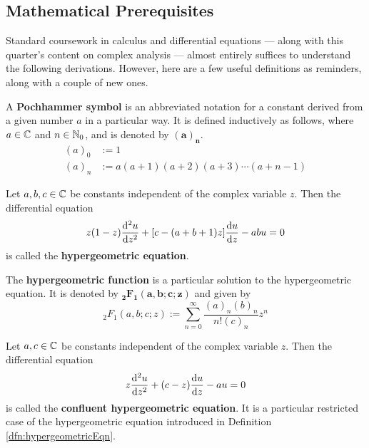 \documentclass[titlepage]{article}
\numberwithin{equation}{section}
\begin{document}
\subsection{Mathematical Prerequisites}\label{sss:prereqs}
Standard coursework in calculus and differential equations --- along with this quarter's content on complex analysis --- almost entirely suffices to understand the following derivations. However, here are a few useful definitions as reminders, along with a couple of new ones.
\begin{definition}
    A \textbf{Pochhammer symbol} is an abbreviated notation for a constant derived from a given number $a$ in a particular way. It is defined inductively as follows, where $a\in\mathbb{C}$ and $n\in\mathbb{N}_0$, and is denoted by $\bm{(a)_n}$.
    \begin{align*}
        (a)_0 &:= 1\\
        (a)_n &:= a(a+1)(a+2)(a+3)\cdots(a+n-1)\tag{$n=1,2,3,\dots$}
    \end{align*}
\end{definition}
\begin{definition}\label{dfn:hypergeometricEqn}
    Let $a,b,c\in\mathbb{C}$ be constants independent of the complex variable $z$. Then the differential equation
    \begin{equation*}
        z(1-z)\dv[2]{u}{z}+[c-(a+b+1)z]\dv{u}{z}-abu = 0
    \end{equation*}
    is called the \textbf{hypergeometric equation}.
\end{definition}
\begin{definition}
    The \textbf{hypergeometric function} is a particular solution to the hypergeometric equation. It is denoted by $\bm{{}_2F_1(a,b;c;z)}$ and given by
    \begin{equation*}
        {}_2F_1(a,b;c;z) := \sum_{n=0}^\infty\frac{(a)_n(b)_n}{n!(c)_n}z^n
    \end{equation*}
\end{definition}
\begin{definition}\label{dfn:hypergeometricEqnC}
    Let $a,c\in\mathbb{C}$ be constants independent of the complex variable $z$. Then the differential equation
    \begin{equation*}
        z\dv[2]{u}{z}+(c-z)\dv{u}{z}-au = 0
    \end{equation*}
    is called the \textbf{confluent hypergeometric equation}. It is a particular restricted case of the hypergeometric equation introduced in Definition \ref{dfn:hypergeometricEqn}.
\end{definition}
\end{document}
